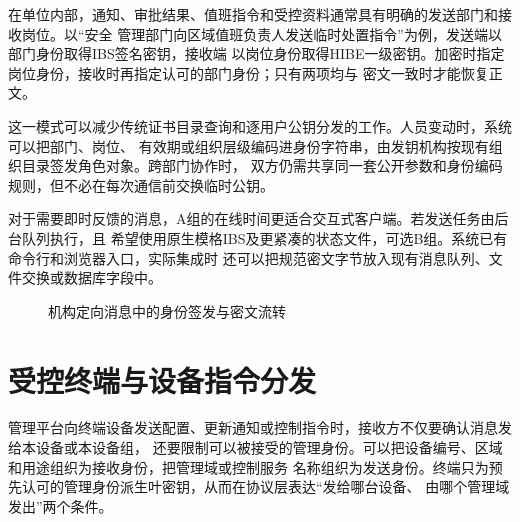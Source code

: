 在单位内部，通知、审批结果、值班指令和受控资料通常具有明确的发送部门和接收岗位。以“安全
管理部门向区域值班负责人发送临时处置指令”为例，发送端以部门身份取得IBS签名密钥，接收端
以岗位身份取得HIBE一级密钥。加密时指定岗位身份，接收时再指定认可的部门身份；只有两项均与
密文一致时才能恢复正文。

这一模式可以减少传统证书目录查询和逐用户公钥分发的工作。人员变动时，系统可以把部门、岗位、
有效期或组织层级编码进身份字符串，由发钥机构按现有组织目录签发角色对象。跨部门协作时，
双方仍需共享同一套公开参数和身份编码规则，但不必在每次通信前交换临时公钥。

对于需要即时反馈的消息，A组的在线时间更适合交互式客户端。若发送任务由后台队列执行，且
希望使用原生模格IBS及更紧凑的状态文件，可选B组。系统已有命令行和浏览器入口，实际集成时
还可以把规范密文字节放入现有消息队列、文件交换或数据库字段中。

\begin{figure}[H]
\centering
{}
\caption{机构定向消息中的身份签发与密文流转}
\label{fig:institutional-message}
\end{figure}

\section{受控终端与设备指令分发}

管理平台向终端设备发送配置、更新通知或控制指令时，接收方不仅要确认消息发给本设备或本设备组，
还要限制可以被接受的管理身份。可以把设备编号、区域和用途组织为接收身份，把管理域或控制服务
名称组织为发送身份。终端只为预先认可的管理身份派生叶密钥，从而在协议层表达“发给哪台设备、
由哪个管理域发出”两个条件。

